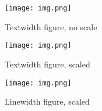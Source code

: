 \documentclass[letterpaper, 10pt, twocolumn]{article}
\begin{document}
\begin{figure*}[hp]
\centering
\texttt{[image: img.png]}
\caption{Textwidth figure, no scale}
\end{figure*}

\begin{figure*}[hp]
\centering
\texttt{[image: img.png]}
\caption{Textwidth figure, scaled}
\end{figure*}

\begin{figure}[hp]
\centering
\texttt{[image: img.png]}
\caption{Linewidth figure, scaled}
\end{figure}
\end{document}
